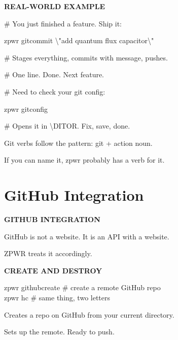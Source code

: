 \documentclass[11pt,a4paper,twoside]{book}
\begin{document}
\vspace{12pt}
{\bfseries\color{neonyellow} REAL-WORLD EXAMPLE}\vspace{4pt}

\# You just finished a feature. Ship it:

\begin{codebox}
zpwr gitcommit \textbackslash{}"add quantum flux capacitor\textbackslash{}"\\
\end{codebox}

\# Stages everything, commits with message, pushes.

\# One line. Done. Next feature.

\# Need to check your git config:

\begin{codebox}
zpwr gitconfig\\
\end{codebox}

\# Opens it in \textbackslash{}DITOR. Fix, save, done.

Git verbs follow the pattern: git + action noun.

If you can name it, zpwr probably has a verb for it.


\vspace{16pt}

\section{GitHub Integration}


\vspace{10pt}
{\large\bfseries\color{neoncyan} GITHUB INTEGRATION}\vspace{6pt}

GitHub is not a website. It is an API with a website.

ZPWR treats it accordingly.


\vspace{12pt}
{\bfseries\color{neonyellow} CREATE AND DESTROY}\vspace{4pt}

\begin{codebox}
zpwr githubcreate      \# create a remote GitHub repo\\
zpwr hc               \# same thing, two letters\\
\end{codebox}

Creates a repo on GitHub from your current directory.

Sets up the remote. Ready to push.
\end{document}
